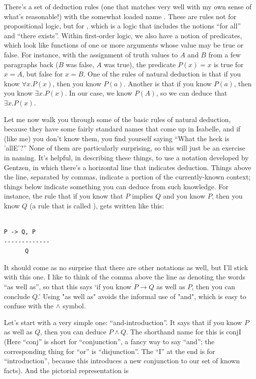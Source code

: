 There's a set of deduction rules (one that matches very well with my own sense of what's reasonable!) with the somewhat loaded name . These are rules not for propositional logic, but for , which is a logic that includes the notions ``for all'' and ``there exists''. Within first-order logic, we also have a notion of predicates, which look like functions of one or more arguments whose value may be true or false. For instance, with the assignment of truth values to $A$ and $B$ from a few paragraphs back ($B$ was false, $A$ was true),  the predicate $P(x) = x$ is true for $x = A$, but false for $x = B$. One of the rules of natural deduction is that if you know $\forall  x . P(x)$, then you know $P(a)$. Another is that if you know $P(a)$, then you know $\exists x . P(x)$. In our case, we know $P(A)$, so we can deduce that $\exists x . P(x)$. 

Let me now walk you through some of the basic rules of natural deduction, because they have some fairly standard names that come up in Isabelle, and if (like me) you don't know them, you find yourself saying ``What the heck is 'allE'?'' None of them are particularly surprising, so this will just be an exercise in naming. It's helpful, in describing these things, to use a notation developed by Gentzen, in which there's a horizontal line that indicates deduction. Things above the line, separated by commas, indicate a portion of the currently-known context; things below indicate something you can deduce from such knowledge. For instance, the rule that if you know that $P$ implies $Q$ and you know $P$, then you know $Q$ (a rule that is called ), gets written like this:

\begin{verbatim}
    
P -> Q, P
-------------
      Q
\end{verbatim}


It should come as no surprise that there are other notations as well, but I'll stick with this one. I like to think of the comma above the line as denoting the words ``as well as'', so that this says `if you know $P \to Q $ as well as $P$, then you can conclude $Q$.' Using "as well as" avoids the informal use of "and", which is easy to confuse with the $\wedge$ symbol.

Let's start with a very simple one: ``and-introduction''. It says that if you know $P$ as well as $Q$, then you can deduce $P \wedge  Q$. The shorthand name for this is conjI (Here ``conj'' is short for ``conjunction'', a fancy way to say ``and''; the corresponding thing for ``or'' is ``disjunction''. The ``I'' at the end is for ``introduction'', because this introduces a new conjunction to our set of known facts). And the pictorial representation is


